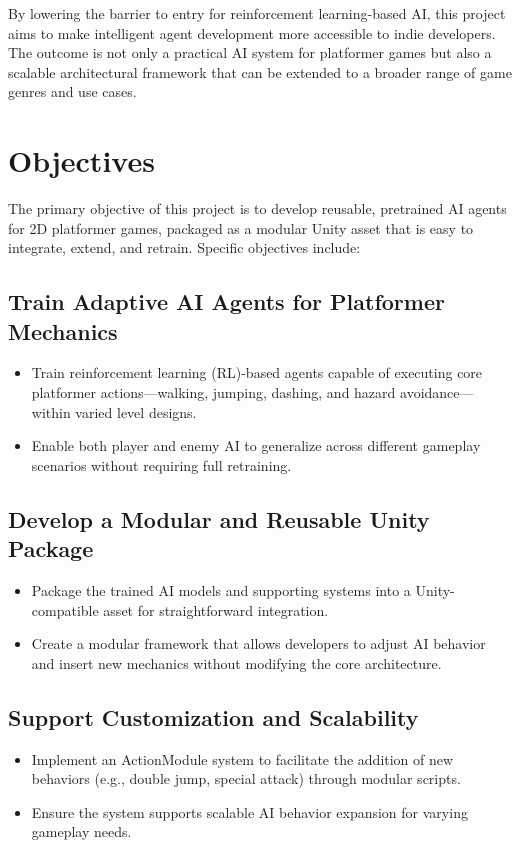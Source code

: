 \documentclass[12pt,oneside,openright,a4paper]{cpe-english-project}
\begin{document}
By lowering the barrier to entry for reinforcement learning-based AI, this project aims to make intelligent agent development more accessible to indie developers. The outcome is not only a practical AI system for platformer games but also a scalable architectural framework that can be extended to a broader range of game genres and use cases.\par

\section{Objectives}
The primary objective of this project is to develop reusable, pretrained AI agents for 2D platformer games, packaged as a modular Unity asset that is easy to integrate, extend, and retrain. Specific objectives include:
\subsection{Train Adaptive AI Agents for Platformer Mechanics}
\begin{itemize}
\item Train reinforcement learning (RL)-based agents capable of executing core platformer actions—walking, jumping, dashing, and hazard avoidance—within varied level designs.
\item Enable both player and enemy AI to generalize across different gameplay scenarios without requiring full retraining.
\end{itemize}
\subsection{Develop a Modular and Reusable Unity Package}
\begin{itemize}
\item Package the trained AI models and supporting systems into a Unity-compatible asset for straightforward integration.
\item Create a modular framework that allows developers to adjust AI behavior and insert new mechanics without modifying the core architecture.
\end{itemize}
\subsection{Support Customization and Scalability}
\begin{itemize}
\item Implement an ActionModule system to facilitate the addition of new behaviors (e.g., double jump, special attack) through modular scripts.
\item Ensure the system supports scalable AI behavior expansion for varying gameplay needs.
\end{itemize}
\end{document}
